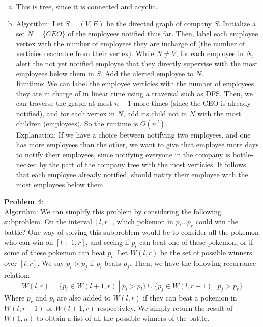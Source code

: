 \documentclass{article}
\begin{document}
\begin{enumerate}[a)]
    \item This is tree, since it is connected and acyclic.
    \item Algorithm: Let $S = (V, E)$ be the directed graph of company $S$. Initialize a set $N = \{CEO\}$ of the employees notified thus far. 
    Then, label each employee vertex with the number of employees they are incharge of (the number of verticies reachable from their vertex). While $N \neq V$, for each employee in $N$, alert the not yet notified employee that they directly supervise with the most employees below them in $S$. Add the alerted employee to $N$.\\[0.5ex]
    Runtime: We can label the employee verticies with the number of employees they are in charge of in linear time using a traversal such as DFS. Then, we can traverse the graph at most $n - 1$ more times (since the CEO is already notified), and for each vertex in $N$, 
    add its child not in $N$ with the most children (employees). So the runtime is $O(n^2)$. \\[0.5ex]
    Explanation: If we have a choice between notifying two employees, and one has more employees than the other, we want to give that employee more days to notify their employees, since notifying everyone in the company is bottle-necked by the part of the company tree with the most verticies. It follows that each employee already notified, should notify their employee with the most employees below them. 
\end{enumerate}
\textbf{Problem 4}: \\[1.0ex]
Algorithm: We can simplify this problem by considering the following subproblem. On the interval $[l, r]$, which pokemon in $p_l \dots p_r$ could win the battle? One way of solving this subproblem would be to consider all the pokemon who can win on $[l + 1, r]$, and seeing if $p_l$ can beat one of these pokemon, or if some of these pokemon can beat $p_l$. Let $W(l, r)$ be the set of possible winners over $[l, r]$. We say $p_i > p_j$ if $p_i$ beats $p_j$. Then, we have the following recurrance relation: 
\begin{equation*}
    W(l, r) = \{p_i \in W(l + 1, r)\ |\ p_i > p_l\} \cup \{p_j \in W(l, r - 1)\ |\ p_j > p_r\}
\end{equation*}
Where $p_r$ and $p_l$ are also added to $W(l, r)$ if they can beat a pokemon in $W(l, r - 1)$ or $W(l + 1, r)$ respectivley. We simply return the result of $W(1, n)$ to obtain a list of all the possible winners of the battle. \\[0.5ex]
\end{document}
